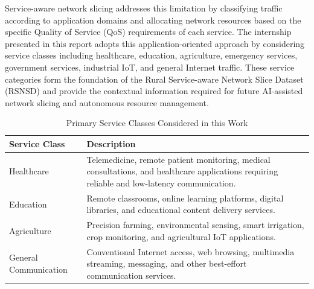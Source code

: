 \documentclass[12pt,a4paper]{report}
\begin{document}
Service-aware network slicing addresses this limitation by classifying traffic according to application domains and allocating network resources based on the specific Quality of Service (QoS) requirements of each service. The internship presented in this report adopts this application-oriented approach by considering service classes including healthcare, education, agriculture, emergency services, government services, industrial IoT, and general Internet traffic. These service categories form the foundation of the Rural Service-aware Network Slice Dataset (RSNSD) and provide the contextual information required for future AI-assisted network slicing and autonomous resource management.

	
	
	
\begin{table}[H]
	\centering
	\caption{Primary Service Classes Considered in this Work}
	\label{tab:services}
	
	\begin{tabular}{|p{4cm}|p{9cm}|}
		\hline
		
		\textbf{Service Class} &
		\textbf{Description}
		\\
		\hline
		
		Healthcare &
		Telemedicine, remote patient monitoring, medical consultations, and healthcare applications requiring reliable and low-latency communication.
		\\
		\hline
		
		Education &
		Remote classrooms, online learning platforms, digital libraries, and educational content delivery services.
		\\
		\hline
		
		Agriculture &
		Precision farming, environmental sensing, smart irrigation, crop monitoring, and agricultural IoT applications.
		\\
		\hline
		
		General Communication &
		Conventional Internet access, web browsing, multimedia streaming, messaging, and other best-effort communication services.
		\\
		\hline
		
	\end{tabular}
	
\end{table}
	
\end{document}
